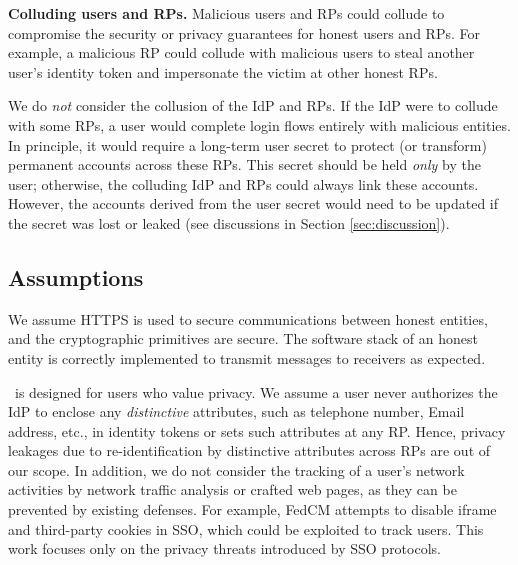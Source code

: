 \noindent \textbf{Colluding users and RPs.}
Malicious users and RPs could collude to compromise the security or privacy guarantees for honest users and RPs.
For example, a malicious RP could collude with malicious users to steal another user's identity token and impersonate the victim at other honest RPs.

We do \emph{not} consider the collusion of the IdP and RPs.
If the IdP were to collude with some RPs, a user would complete login flows entirely with malicious entities.
In principle, it would require a long-term user secret to protect (or transform) permanent accounts across these RPs.
This secret should be held \emph{only} by the user; otherwise, the colluding IdP and RPs could always link these accounts.
However, the accounts derived from the user secret would need to be updated if the secret was lost or leaked (see discussions in Section \ref{sec:discussion}).


\subsection{Assumptions}
We assume HTTPS is used to secure communications between honest entities, and the cryptographic primitives are secure. The software stack of an honest entity is correctly implemented to transmit messages to receivers as expected.

\usso\ is designed for users who value privacy. We assume a user never authorizes the IdP to enclose any \emph{distinctive} attributes, such as telephone number, Email address, etc., in identity tokens or sets such attributes at any RP. Hence, privacy leakages due to re-identification by distinctive attributes across RPs are out of our scope.
In addition, we do not consider the tracking of a user's network activities by network traffic analysis or crafted web pages, as they can be prevented by existing defenses. \newc
For example, FedCM \cite{FedCM} attempts to disable iframe and third-party cookies in SSO, which could be exploited to track users. This work focuses only on the privacy threats introduced by SSO protocols.

\oldc


